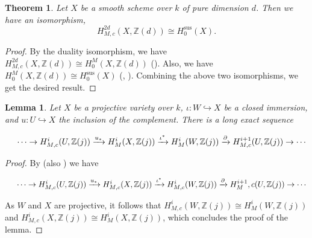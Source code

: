 \documentclass[12pt]{amsart}
\newtheorem{theo}[theo]{Theorem}
\newtheorem{lem}[lem]{Lemma}
\theoremstyle{remark}
\renewcommand{\1}{{\mathbb{S}}}
\newcommand{\inj}{\hookrightarrow}
\newcommand{\<}{\langle}
\renewcommand{\>}{\rangle}
\newcommand{\Sus}{{\operatorname{sus}}}
\begin{document}
\begin{theo}\label{thm:compactly-support-suslin}
    Let $X$ be a smooth scheme over $k$ of pure dimension $d$. %
    Then we have an isomorphism,
    \begin{equation}\label{compact-motivic-Sus-iso}
        H^{2d}_{M,c}(X, \mathbb{Z}(d)) \cong H^{\Sus}_{0}(X).
    \end{equation}
\end{theo}
\begin{proof}
 By the duality isomorphism, we have
 $ H_{M,c}^{2d}(X, \mathbb{Z}(d)) \cong H^{M}_{0}(X, \mathbb{Z}(d))$ (\cite[Remark 2.2]{Yam1}). Also, we have $H^{M}_{0}(X, \mathbb{Z}(d)) \cong H^{\Sus}_{0}(X)$ (\cite{Sus}, \cite[Theorem 1.3]{Yam1}). Combining the above two isomorphisms, we get the desired result. 
 
 \end{proof}




\begin{lem}\label{lem:cohomology Ex-seq}
	Let $X $ be a projective variety over $k$,  $\iota \colon W \inj X$ be a closed immersion, and 
	$u \colon U \inj X$ the inclusion of the complement. There is a long exact sequence
	
	\begin{center}
		$ \hspace*{0.5cm}   \cdots \to H^i_{M,c}(U, \mathbb{Z}(j)) \xrightarrow{u_*}
		H^i_M(X, \mathbb{Z}(j)) 
		\xrightarrow{\iota^*}  H^i_{M}(W, \mathbb{Z}(j)) \xrightarrow{\partial}
		H^{i+1}_{M,c}(U, \mathbb{Z}(j)) \to \cdots $
	\end{center}
	
	

\end{lem}
\begin{proof}
By \cite[Theorem 5.11]{CD2} (also \cite[Lemma 8.4]{GKR}) we have 
\begin{center}
		$  \hspace*{0.5cm}   \cdots \to H^i_{M,c}(U, \mathbb{Z}(j)) \xrightarrow{u_*}
		H^i_{M,c}(X, \mathbb{Z}(j)) 
		\xrightarrow{\iota^*}  H^i_{M,c}(W, \mathbb{Z}(j)) \xrightarrow{\partial}
		H^{i+1}_M,c(U, \mathbb{Z}(j)) \to \cdots $
	\end{center}
As $W$ and $X$ are projective,  it follows that $H^i_{M,c}(W, \mathbb{Z}(j)) \cong H^i_{M}(W, \mathbb{Z}(j))$ and $H^i_{M,c}(X, \mathbb{Z}(j)) \cong H_{M}^i(X, \mathbb{Z}(j))$, which concludes the proof of the lemma.

\end{proof}
\end{document}
